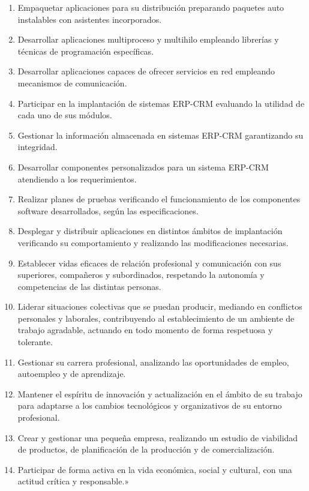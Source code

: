 \begin{enumerate}[label=\alph*)]
\item Empaquetar aplicaciones para su distribución preparando paquetes auto instalables con asistentes incorporados.
\item Desarrollar aplicaciones multiproceso y multihilo empleando librerías y técnicas de programación específicas.
\item Desarrollar aplicaciones capaces de ofrecer servicios en red empleando mecanismos de comunicación.
\item Participar en la implantación de sistemas ERP-CRM evaluando la utilidad de cada uno de sus módulos.
\item Gestionar la información almacenada en sistemas ERP-CRM garantizando su integridad.
\item Desarrollar componentes personalizados para un sistema ERP-CRM atendiendo a los requerimientos.
\item Realizar planes de pruebas verificando el funcionamiento de los componentes software desarrollados, según las especificaciones.
\item Desplegar y distribuir aplicaciones en distintos ámbitos de implantación verificando su comportamiento y realizando las modificaciones necesarias.
\item \label{comp:03t} Establecer vidas eficaces de relación profesional y comunicación con sus superiores, compañeros y subordinados, respetando la autonomía y competencias de las distintas personas.
\item Liderar situaciones colectivas que se puedan producir, mediando en conflictos personales y laborales, contribuyendo al establecimiento de un ambiente de trabajo agradable, actuando en todo momento de forma respetuosa y tolerante.
\item Gestionar su carrera profesional, analizando las oportunidades de empleo, autoempleo y de aprendizaje.
\item \label{comp:04w} Mantener el espíritu de innovación y actualización en el ámbito de su trabajo para adaptarse a los cambios tecnológicos y organizativos de su entorno profesional.
\item Crear y gestionar una pequeña empresa, realizando un estudio de viabilidad de productos, de planificación de la producción y de comercialización.
\item Participar de forma activa en la vida económica, social y cultural, con una actitud crítica y responsable.»
\end{enumerate}

